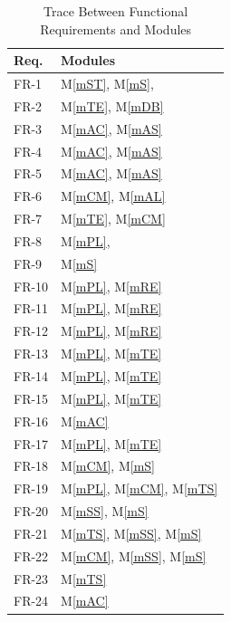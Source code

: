 \documentclass[12pt, titlepage]{article}
\newcommand{\mref}[1]{M\ref{#1}}
\begin{document}
\begin{table}[H]
\centering
\begin{tabular}{p{} p{}}
\toprule
\textbf{Req.} & \textbf{Modules}\\
\midrule
FR-1 & \mref{mST}, \mref{mS},\\
FR-2 & \mref{mTE}, \mref{mDB}\\
FR-3 & \mref{mAC}, \mref{mAS}\\
FR-4 & \mref{mAC}, \mref{mAS}\\
FR-5 & \mref{mAC}, \mref{mAS}\\
FR-6 & \mref{mCM}, \mref{mAL}\\
FR-7 & \mref{mTE}, \mref{mCM}\\
FR-8 & \mref{mPL},\\
FR-9 & \mref{mS}\\
FR-10 & \mref{mPL}, \mref{mRE}\\
FR-11 & \mref{mPL}, \mref{mRE}\\
FR-12 & \mref{mPL}, \mref{mRE}\\
FR-13 & \mref{mPL}, \mref{mTE}\\
FR-14 & \mref{mPL}, \mref{mTE}\\
FR-15 & \mref{mPL}, \mref{mTE}\\
FR-16 & \mref{mAC}\\
FR-17 & \mref{mPL}, \mref{mTE}\\
FR-18 & \mref{mCM}, \mref{mS}\\
FR-19 & \mref{mPL}, \mref{mCM}, \mref{mTS}\\
FR-20 & \mref{mSS}, \mref{mS}\\
FR-21 & \mref{mTS}, \mref{mSS}, \mref{mS}\\
FR-22 & \mref{mCM}, \mref{mSS}, \mref{mS}\\
FR-23 & \mref{mTS}\\
FR-24 & \mref{mAC}\\
\bottomrule
\end{tabular}
\caption{Trace Between Functional Requirements and Modules}
\label{TblRT}
\end{table}
\end{document}
